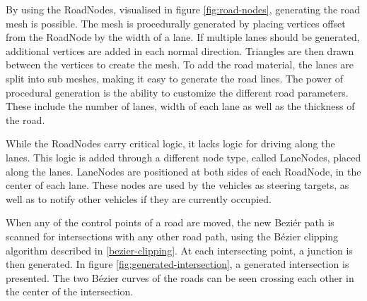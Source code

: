         By using the RoadNodes, visualised in figure \ref{fig:road-nodes}, generating the road mesh is possible. The mesh is procedurally generated by placing vertices offset from the RoadNode by the width of a lane. If multiple lanes should be generated, additional vertices are added in each normal direction. Triangles are then drawn between the vertices to create the mesh. To add the road material, the lanes are split into sub meshes, making it easy to generate the road lines. The power of procedural generation is the ability to customize the different road parameters. These include the number of lanes, width of each lane as well as the thickness of the road.

        While the RoadNodes carry critical logic, it lacks logic for driving along the lanes. This logic is added through a different node type, called LaneNodes, placed along the lanes. LaneNodes are positioned at both sides of each RoadNode, in the center of each lane. These nodes are used by the vehicles as steering targets, as well as to notify other vehicles if they are currently occupied.

        When any of the control points of a road are moved, the new Beziér path is scanned for intersections with any other road path, using the Bézier clipping algorithm described in \ref{bezier-clipping}. At each intersecting point, a junction is then generated. In figure \ref{fig:generated-intersection}, a generated intersection is presented. The two Bézier curves of the roads can be seen crossing each other in the center of the intersection.

